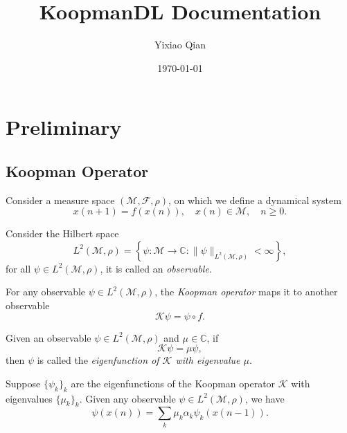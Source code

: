 \documentclass[en, bibend=bibtex]{elegantpaper}
\title{KoopmanDL Documentation}
\author{Yixiao Qian}
\institute{Zhejiang University}
\date{\today}
\theoremstyle{plain}
\begin{document}
\maketitle
\tableofcontents
\newpage

\section{Preliminary}

\subsection{Koopman Operator}

Consider a measure space $(\mathcal{M}, \mathcal{F}, \rho)$,
on which we define a dynamical system
\begin{equation*}
  x(n+1) = f(x(n)), \quad x(n) \in \mathcal{M}, \quad n \geq 0.
\end{equation*}

\begin{definition}
  Consider the Hilbert space
  \begin{equation*}
  L^2(\mathcal{M}, \rho) = \left\{ \psi: \mathcal{M} \rightarrow \mathbb{C}:
    \|\psi\|_{L^2(\mathcal{M},\rho)} < \infty \right\},
  \end{equation*}
  for all $\psi \in L^2(\mathcal{M}, \rho)$, it is called an \emph{observable}.
\end{definition}

\begin{definition}
  For any observable $\psi \in L^2(\mathcal{M}, \rho)$,
  the \emph{Koopman operator} maps it to another observable
  \begin{equation*}
    \mathcal{K} \psi = \psi \circ f.
  \end{equation*}
\end{definition}

\begin{definition}
  Given an observable $\psi \in L^2(\mathcal{M}, \rho)$
  and $\mu \in \mathbb{C}$, if
  \begin{equation*}
    \mathcal{K} \psi = \mu \psi,
  \end{equation*}
  then $\psi$ is called the \emph{eigenfunction of $\mathcal{K}$ with eigenvalue $\mu$}.
\end{definition}

\begin{proposition}
  Suppose $\{\psi_k\}_k$ are the eigenfunctions of
  the Koopman operator $\mathcal{K}$
  with eigenvalues $\{\mu_k\}_k$.
  Given any observable $\psi \in L^2(\mathcal{M}, \rho)$,
  we have
  \begin{equation}
    \label{eq:koopman-mode-decomposition-one-step}
    \psi(x(n)) = \sum\limits_k \mu_k \alpha_k \psi_k(x(n-1)).
  \end{equation}
\end{proposition}
\end{document}
